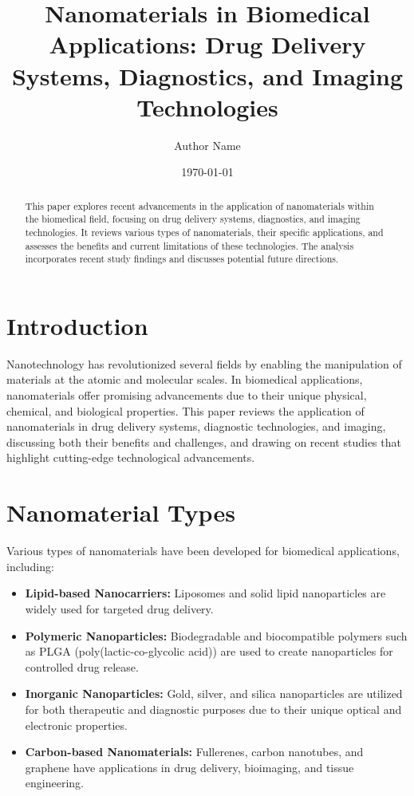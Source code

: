\documentclass[10pt]{article}
\title{Nanomaterials in Biomedical Applications: Drug Delivery Systems, Diagnostics, and Imaging Technologies}
\author{Author Name}
\date{\today}
\begin{document}
\maketitle

\begin{abstract}
This paper explores recent advancements in the application of nanomaterials within the biomedical field, focusing on drug delivery systems, diagnostics, and imaging technologies. It reviews various types of nanomaterials, their specific applications, and assesses the benefits and current limitations of these technologies. The analysis incorporates recent study findings and discusses potential future directions.
\end{abstract}

\section{Introduction}
Nanotechnology has revolutionized several fields by enabling the manipulation of materials at the atomic and molecular scales. In biomedical applications, nanomaterials offer promising advancements due to their unique physical, chemical, and biological properties. This paper reviews the application of nanomaterials in drug delivery systems, diagnostic technologies, and imaging, discussing both their benefits and challenges, and drawing on recent studies that highlight cutting-edge technological advancements.

\section{Nanomaterial Types}
Various types of nanomaterials have been developed for biomedical applications, including:
\begin{itemize}
    \item \textbf{Lipid-based Nanocarriers:} Liposomes and solid lipid nanoparticles are widely used for targeted drug delivery.
    \item \textbf{Polymeric Nanoparticles:} Biodegradable and biocompatible polymers such as PLGA (poly(lactic-co-glycolic acid)) are used to create nanoparticles for controlled drug release.
    \item \textbf{Inorganic Nanoparticles:} Gold, silver, and silica nanoparticles are utilized for both therapeutic and diagnostic purposes due to their unique optical and electronic properties.
    \item \textbf{Carbon-based Nanomaterials:} Fullerenes, carbon nanotubes, and graphene have applications in drug delivery, bioimaging, and tissue engineering.
\end{itemize}
\end{document}
